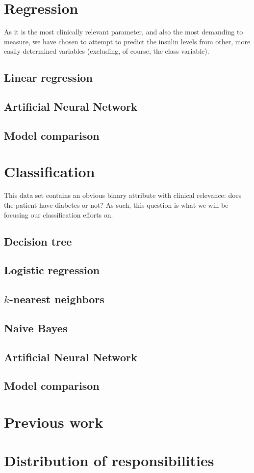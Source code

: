 \section{Regression}
As it is the most clinically relevant parameter,
and also the most demanding to measure,
we have chosen to attempt to predict the insulin levels
from other, more easily determined variables
(excluding, of course, the class variable).

\subsection{Linear regression}

\subsection{Artificial Neural Network}

\subsection{Model comparison}


\section{Classification}

This data set contains an obvious binary attribute
with clinical relevance:
does the patient have diabetes or not?
As such, this question is what we will be
focusing our classification efforts on.

\subsection{Decision tree}

\subsection{Logistic regression}

\subsection{$k$-nearest neighbors}

\subsection{Naive Bayes}

\subsection{Artificial Neural Network}

\subsection{Model comparison}

\section{Previous work}

\appendix
\section{Distribution of responsibilities}